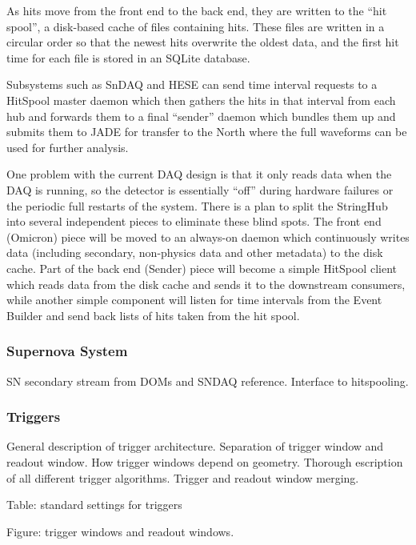 As hits move from the front end to the back end, they are written to the
``hit spool'', a disk-based cache of files containing hits.  These files are
written in a circular order so that the newest hits overwrite the oldest data,
and the first hit time for each file is stored in an SQLite database.

Subsystems such as SnDAQ and HESE can send time interval requests to a HitSpool
master daemon which then gathers the hits in that interval from each hub and
forwards them to a final ``sender'' daemon which bundles them up and submits
them to JADE for transfer to the North where the full waveforms can be used for
further analysis.

One problem with the current DAQ design is that it only reads data when the
DAQ is running, so the detector is essentially ``off'' during hardware failures
or the periodic full restarts of the system.  There is a plan to split the
StringHub into several independent pieces to eliminate these blind spots.
The front end (Omicron) piece will be moved to an always-on daemon which
continuously writes data (including secondary, non-physics data and other
metadata) to the disk cache.  Part of the back end (Sender) piece will become a
simple HitSpool client which reads data from the disk cache and sends it to
the downstream consumers, while another simple component will listen for time
intervals from the Event Builder and send back lists of hits taken from the
hit spool.

\subsubsection{Supernova System}

SN secondary stream from DOMs and SNDAQ reference.  Interface to
hitspooling.  

\subsubsection{Triggers}

General description of trigger architecture.  Separation of trigger window
and readout window.  How trigger windows depend on geometry.  Thorough
escription of all different trigger algorithms. Trigger and readout window
merging. 


Table: standard settings for triggers

Figure: trigger windows and readout windows.

